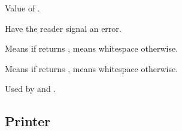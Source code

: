 \begin{LIST}{1cm}
  Value of .

  \IT{\KWD{\#\boldmath$<$}}
  Have the reader signal an error.

  Means  if  returns \T, means whitespace
  otherwise. 

  Means  if  returns \NIL, means whitespace
  otherwise. 

  Used by \kwd{\#+} and \kwd{\#--}.

\end{LIST}


\subsection{Printer} 


